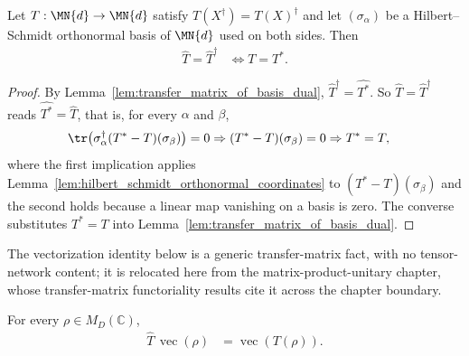 \begin{lemma}
    \label{lem:transfer_matrix_of_basis_hermitian_iff}
    \leanok
    Let $T:\MN{d}\to\MN{d}$ satisfy $T(X^\dagger)=T(X)^\dagger$ and let
    $(\sigma_\alpha)$ be a Hilbert--Schmidt orthonormal basis of $\MN{d}$ used on
    both sides. Then
    \begin{align}
        \widehat T=\widehat T^\dagger
        &\iff T=T^*.
    \end{align}
\end{lemma}

\begin{proof}\leanok
    By Lemma~\ref{lem:transfer_matrix_of_basis_dual},
    $\widehat T^\dagger=\widehat{T^*}$. So $\widehat T=\widehat T^\dagger$ reads
    $\widehat{T^*}=\widehat T$, that is, for every $\alpha$ and $\beta$,
    \begin{align}
        \tr\bigl(\sigma_\alpha^\dagger(T^*-T)(\sigma_\beta)\bigr)=0
        &\Rightarrow (T^*-T)(\sigma_\beta)=0 \Rightarrow T^*=T,
    \end{align}
    where the first implication applies
    Lemma~\ref{lem:hilbert_schmidt_orthonormal_coordinates} to
    $(T^*-T)(\sigma_\beta)$ and the second holds because a linear map vanishing
    on a basis is zero. The converse substitutes $T^*=T$ into
    Lemma~\ref{lem:transfer_matrix_of_basis_dual}.
\end{proof}

The vectorization identity below is a generic transfer-matrix fact, with no
tensor-network content; it is relocated here from the matrix-product-unitary
chapter, whose transfer-matrix functoriality results cite it across the
chapter boundary.

\begin{theorem}
    \label{thm:mpu_transfer_matrix_vectorization}
    \leanok
    For every $\rho\in M_D(\mathbb C)$,
    \begin{align}
        \widehat T\,\operatorname{vec}(\rho)
        &=\operatorname{vec}(T(\rho)).
    \end{align}
\end{theorem}

